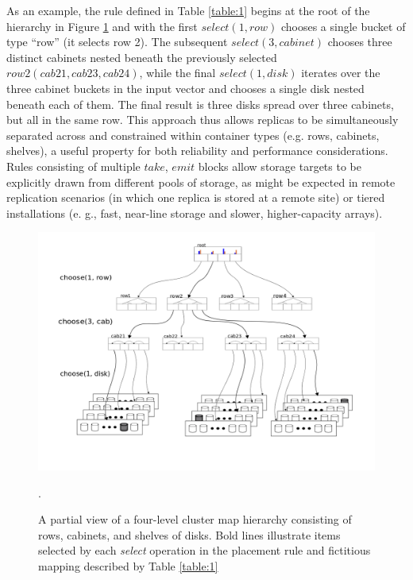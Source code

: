 \documentclass[12pt,a4paper]{report}
\begin{document}
As an example, the rule defined in Table \ref{table:1} begins at the root of the hierarchy
in Figure \ref{fig:ceph_host} and with the first $select(1,row)$ chooses a single bucket of type
``row'' (it selects row 2). The subsequent $select(3,cabinet)$ chooses three
distinct cabinets nested  beneath the previously selected $row2 (cab21, cab23,
cab24)$, while the final $select(1,disk)$ iterates over the three cabinet
buckets in the input vector and chooses a single disk nested beneath each of
them. The final result is three disks spread over three cabinets, but all in
the same row. This approach thus allows replicas to be simultaneously separated
across and constrained within container types (e.g. rows, cabinets, shelves), a
useful property for both reliability and performance considerations. Rules
consisting of multiple $take$, $emit$ blocks allow storage targets to be
explicitly drawn from different pools of storage, as might be expected in
remote replication scenarios (in which one replica is stored at a remote site)
or tiered installations (e. g., fast, near-line storage and slower,
higher-capacity arrays).

\begin{figure}[h!]
	\includegraphics[scale=0.40]{ceph_host.png}
\caption{A partial view of a four-level cluster map hierarchy consisting of
rows, cabinets, and shelves of disks. Bold lines illustrate items selected by
each \emph{select} operation in the placement rule and fictitious mapping
described by Table \ref{table:1}}.
	\label{fig:ceph_host}
\end{figure}
\end{document}
